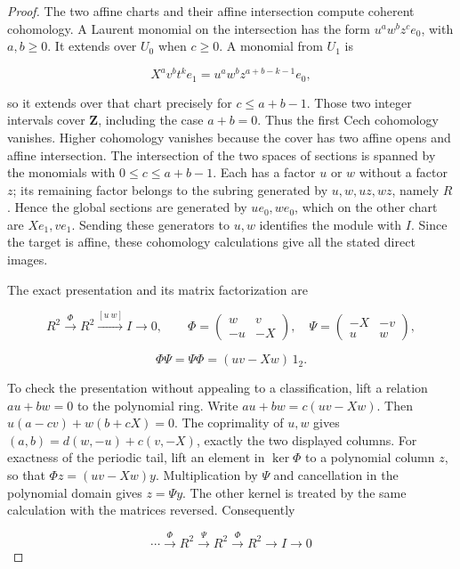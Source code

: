 \begin{proof}
The two affine charts and their affine intersection compute
coherent cohomology.  A Laurent monomial on the intersection has the
form \(u^a w^b z^c e_0\), with \(a,b\geq0\).  It extends over \(U_0\)
when \(c\geq0\).  A monomial from \(U_1\) is

\[
 X^a v^b t^k e_1=u^a w^b z^{a+b-k-1}e_0,
\]

so it extends over that chart precisely for \(c\leq a+b-1\).
Those two integer intervals cover \(\mathbf Z\), including the case
\(a+b=0\).  Thus the first Cech cohomology vanishes.  Higher cohomology
vanishes because the cover has two affine opens and affine intersection.
The intersection of the two spaces of sections is spanned by the
monomials with \(0\leq c\leq a+b-1\).  Each has a factor \(u\) or \(w\)
without a factor \(z\); its remaining factor belongs to the subring
generated by \(u,w,uz,wz\), namely \(R\).  Hence the global sections are
generated by \(u e_0,w e_0\), which on the other chart are \(X e_1,v e_1\).
Sending these generators to \(u,w\) identifies the module with \(I\).
Since the target is affine, these cohomology calculations give all the
stated direct images.

The exact presentation and its matrix factorization are

\[
 R^2\xrightarrow{\Phi}R^2\xrightarrow{[u\ w]}I\longrightarrow0,
 \qquad
 \Phi=\begin{pmatrix}w&v\\-u&-X\end{pmatrix},\quad
 \Psi=\begin{pmatrix}-X&-v\\u&w\end{pmatrix},
\]

\[
 \Phi\Psi=\Psi\Phi=(uv-Xw)\,1_2.
\]

To check the presentation without appealing to a classification,
lift a relation \(au+bw=0\) to the polynomial ring.  Write
\(au+bw=c(uv-Xw)\).  Then
\(u(a-cv)+w(b+cX)=0\).  The coprimality of \(u,w\) gives
\((a,b)=d(w,-u)+c(v,-X)\), exactly the two displayed columns.
For exactness of the periodic tail, lift an element in
\(\ker\Phi\) to a polynomial column \(z\), so that
\(\Phi z=(uv-Xw)y\).  Multiplication by \(\Psi\) and cancellation in
the polynomial domain gives \(z=\Psi y\).  The other kernel is treated
by the same calculation with the matrices reversed.  Consequently

\[
 \cdots\xrightarrow{\Phi}R^2\xrightarrow{\Psi}R^2
 \xrightarrow{\Phi}R^2\longrightarrow I\longrightarrow0
\]


\end{proof}
